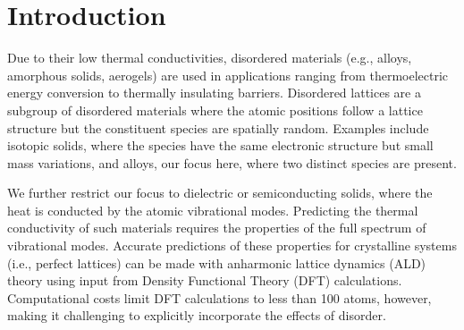 \documentclass[aps,prb,onecolumn,preprint,footinbib,superscriptaddress,amsmath,amssymb,floatfix]{revtex4}
\begin{document}
\section{\label{S:Introduction}Introduction}

Due to their low thermal conductivities, 
disordered materials (e.g., alloys, amorphous solids, aerogels) 
are used in 
applications ranging from thermoelectric energy conversion to 
thermally insulating barriers.
\cite{cahill_lattice_1988,minnich_bulk_2009,chen_recent_2003,
snyder_complex_2008,toberer_phonon_2011,zebarjadi_perspectives_2012} 
Disordered lattices are a subgroup of disordered materials where 
the atomic positions follow a lattice structure but the 
constituent species are spatially random. Examples include isotopic 
solids, where the species have the same electronic structure but 
small mass variations,\cite{tamura_isotope_1983,lindsay_thermal_2012} 
and alloys, our focus here, where two distinct 
species are present.\cite{abeles_thermal_1962,abeles_lattice_1963}

We further restrict our focus to dielectric or semiconducting solids,  
where the heat is conducted by the atomic vibrational modes. 
Predicting the thermal conductivity of such materials 
requires the properties of the full spectrum of vibrational modes.
\cite{ziman_electrons_2001,feldman_thermal_1993,allen_diffusons_1999} 
Accurate predictions of these properties for 
crystalline systems (i.e., perfect lattices)  
can be made with anharmonic lattice dynamics (ALD) theory 
using input from Density Functional Theory (DFT)  
calculations.\cite{ward_intrinsic_2010,lindsay_thermal_2012,
garg_role_2011,
shiga_microscopic_2012,tian_phonon_2012,
shiomi_thermal_2011,esfarjani_heat_2011,
li_thermal_2012,luckyanova_coherent_2012}
Computational costs limit DFT calculations to less than 100 atoms, 
however, making it challenging to explicitly incorporate the effects 
of disorder.
\cite{koker_thermal_2009,bao_first-principles_2012,sosso_thermal_2012,
lindsay_thermal_2012,tian_phonon_2012,garg_role_2011}
\end{document}
